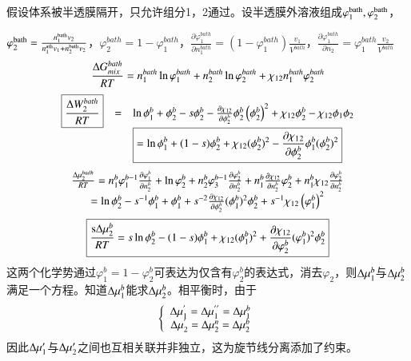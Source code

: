 \documentclass{article} %
\begin{document}
\noindent 假设体系被半透膜隔开，只允许组分1，2通过。设半透膜外溶液组成$\varphi _{1}^{{\rm bath}} ,\varphi _{2}^{{\rm bath}} $，

\noindent $\varphi _{2}^{{\rm bath}} =\frac{n_{1}^{{\rm bath}} v_{2} }{n_{1}^{{\rm ath}} v_{1} +n_{2}^{{\rm bath}} v_{2} } $，$\varphi _{2}^{bath} =1-\varphi _{1}^{bath} $，$\frac{\partial \varphi _{1}^{bath} }{\partial n_{1}^{bath} } =(1-\varphi _{1}^{bath} )\frac{v_{1} }{V^{bath} } $，$\frac{\partial \varphi _{1}^{bath} }{\partial n_{2} } =\varphi _{1}^{bath} \frac{v_{2} }{V^{bath} } $ 
\[\frac{{\rm \Delta }G_{mix}^{bath} }{RT} =n_{1}^{bath} \ln \varphi _{1}^{bath} +n_{2}^{bath} \ln \varphi _{2}^{bath} +\chi _{12} n_{1}^{bath} \varphi _{2}^{bath} \] 
\[\begin{array}{rcl} {\boxed{\frac{{\rm \Delta }W_{2}^{bath} }{RT} } } & {=} & {\ln \phi _{1}^{b} +\phi _{2}^{b} -s\phi _{2}^{b} -\frac{\partial \chi _{12} }{\partial \phi _{2}^{b} } \phi _{2}^{b} \left(\phi _{2}^{b} \right)^{2} +\chi _{12} \phi _{2}^{b} -\chi _{12} \phi _{1} \phi _{2} } \\ {} & {} & {\boxed{=\ln \phi _{1}^{b} +(1-s)\phi _{2}^{b} +\chi _{12} (\phi _{2}^{b} )^{2} -\frac{\partial \chi _{1} {}_{2} }{\partial \phi _{2}^{b} } \phi _{1}^{b} (\phi _{2}^{b} )^{2} } } \end{array}\] 
\[\begin{array}{c} {\frac{{\rm \Delta }\mu _{2}^{badh} }{RT} =n_{1}^{b} \varphi _{1}^{b-1} \frac{\partial \varphi _{1}^{b} }{\partial n_{2}^{b} } +\ln \varphi _{2}^{b} +n_{2}^{b} \varphi _{3}^{b-1} \frac{\partial \varphi _{2}^{b} }{\partial n_{2}^{b} } +n_{1}^{b} \frac{\partial \chi _{12} }{\partial n_{2}^{b} } \varphi _{2}^{b} +n_{1}^{b} \chi _{12} \frac{\partial \varphi _{2}^{b} }{\partial n_{2}^{b} } } \\ {=\ln \phi _{2}^{b} -s^{-1} \phi _{1}^{b} +\phi _{1}^{b} +s^{-2} \frac{\partial \chi _{12} }{\partial \phi _{2}^{b} } (\phi _{1}^{b} )^{2} \phi _{2}^{b} +s^{-1} \chi _{12} \left(\varphi _{1}^{b} \right)^{2} } \end{array}\] 
\[\boxed{\frac{{\rm s\Delta }\mu _{2}^{b} }{RT} =s\ln \phi _{2}^{b} -(1-s)\phi _{1}^{b} +\chi _{12} (\phi _{1}^{b} )^{2} +\frac{\partial \chi _{12} }{\partial \varphi _{2}^{b} } (\varphi _{1}^{b} )^{2} \phi _{2}^{b} } \] 
这两个化学势通过$\varphi _{1}^{b} =1-\varphi _{2}^{b} $可表达为仅含有$\varphi _{2}^{b} $的表达式，消去$\varphi _{2} $，则${\rm \Delta }\mu _{1}^{b} $与${\rm \Delta }\mu _{2}^{b} $满足一个方程。知道${\rm \Delta }\mu _{1}^{b} $能求${\rm \Delta }\mu _{2}^{b} $。相平衡时，由于
\[\left\{\begin{array}{c} {{\rm \Delta }\mu _{1}^{{'} } ={\rm \Delta }\mu _{1}^{{'} {'} } ={\rm \Delta }\mu _{1}^{b} } \\ {{\rm \Delta }\mu _{2}^{{'} } ={\rm \Delta }\mu _{2}^{n} ={\rm \Delta }\mu _{2}^{b} } \end{array}\right. \] 
因此${\rm \Delta }\mu _{1} '$与${\rm \Delta }\mu _{2} '$之间也互相关联并非独立，这为旋节线分离添加了约束。
\end{document}
